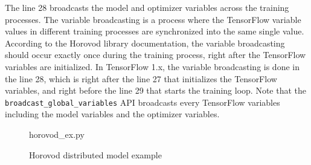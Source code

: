 The line 28 broadcasts the model and optimizer variables across the training
processes.
The variable broadcasting is a process where the TensorFlow 
variable values in different training processes are synchronized into
the same single value.
According to the Horovod library documentation, the variable broadcasting
should occur exactly once during the training process,
right after the TensorFlow variables are initialized.
In TensorFlow 1.x, the variable broadcasting is done in the line 28,
which is right after the line 27 that initializes the TensorFlow variables,
and right before the line 29 that starts the training loop.
Note that the {\tt broadcast\_global\_variables} API broadcasts every
TensorFlow variables including the model variables and the optimizer
variables.

\begin{figure}[ht!]
 
{horovod_ex.py}
  \caption{Horovod distributed model example}
\label{fig:back:hvd2} 
\end{figure}


